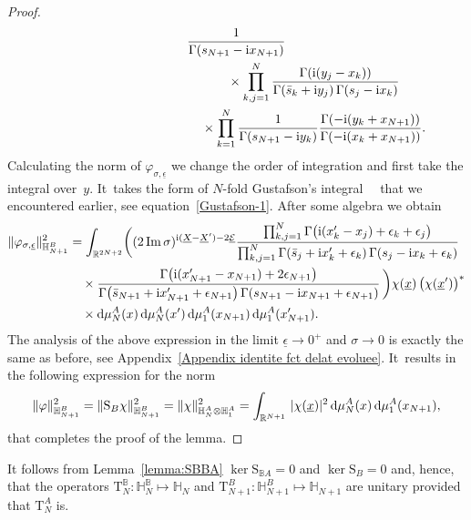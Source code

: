 \begin{proof}
\begin{gather*}
\frac1{\Gamma(s_{N+1}-{\rm i}x_{N+1})}
\\ \hphantom{\big(\Psi^N_{p,\underline y},\Phi^N_{{\sigma,x}}\otimes\Phi^1_{\sigma,x_{N+1}}\big)_{\mathbb H_N} =}
{}\times \prod_{k,j=1}^N\frac{\Gamma({\rm i}(y_j-x_k)
)}{\Gamma(\bar s_k+{\rm i}y_j)\,\Gamma(s_j-{\rm i}x_k)}
\\ \hphantom{\big(\Psi^N_{p,\underline y},\Phi^N_{{\sigma,x}}\otimes\Phi^1_{\sigma,x_{N+1}}\big)_{\mathbb H_N} =}
{}\times \prod_{k=1}^N\frac1{\Gamma(s_{N+1}-{\rm i}y_k)} \frac{ \Gamma(-{\rm i}(y_k+x_{N+1}) )}{\Gamma(-{\rm i}(x_k+x_{N+1}))}.
\end{gather*}
Calculating the norm of $\varphi_{\sigma,\underline \epsilon}$ we change the order of integration and first take the integral over~$y$. It~takes the form of $N$-fold Gustafson's integral~~\cite[Theorem 5.1]{MR1139492} that we encountered earlier, see equation~\eqref{Gustafson-1}.
After some algebra we obtain
\begin{align*}
\|\varphi_{\sigma,\underline \epsilon}\|^2_{\mathbb H_{N+1}^B} & = \int_{\mathbb R^{2N+2}}
\biggl((2\mathop{\rm Im}\sigma)^{{\rm i}(\underline X-\underline X')-2\underline{\mathcal E}}
\frac{\prod_{k,j=1}^{N} \Gamma\big({\rm i}(x'_k-x_j)+\epsilon_k+\epsilon_j\big)}{\prod_{k,j=1}^{N}
\Gamma( \bar s_j+{\rm i}x'_k+\epsilon_k)\,\Gamma( s_j-{\rm i}x_k+\epsilon_k)}
\\
&\quad
\times \frac{\Gamma\big({\rm i}(x'_{N+1}-x_{N+1})+2\epsilon_{N+1}\big)}{
\Gamma\big(\bar s_{N+1}+{\rm i}x'_{N+1}+\epsilon_{N+1}\big)\,\Gamma( s_{N+1}-{\rm i}x_{N+1}+\epsilon_{N+1})}\,\biggr)\chi(\underline x)\, \big(\chi(\underline x')\big)^*
\\
&\quad \times {\rm d}\mu_{N}^A(x)\,{\rm d}\mu_{N}^A(x')\, {\rm d}\mu_{1}^A(x_{N+1})\,{\rm d}\mu_{1}^A(x'_{N+1}).
\end{align*}
The analysis of the above expression in the limit $\underline \epsilon\to 0^+$ and $\sigma \to0$ is exactly the same as before, see
Appendix~\ref{Appendix identite fct delat evoluee}. It~results in the following expression for the norm
\begin{gather*}
\|\varphi\|^2_{\mathbb H_{N+1}^B} =\|\mathrm S_B\chi\|^2_{\mathbb H_{N+1}^B} =\|\chi\|^2_{\mathbb H_{N}^A\otimes \mathbb H_1^A}
=\int_{\mathbb R^{N+1}}\, |\chi(\underline x)|^2\,{\rm d}\mu_{N}^A(x)\, {\rm d}\mu_{1}^A(x_{N+1}),
\end{gather*}
that completes the proof of the lemma.
\end{proof}


It follows from Lemma~\ref{lemma:SBBA} $\ker \mathrm S_{\mathbb BA}=0$ and $\ker \mathrm S_B=0$ and, hence, that the operators $\mathrm
T_{N}^{\mathbb B}\colon \mathbb H_{N}^{\mathbb B}\mapsto \mathbb H_{N}$ and $\mathrm T_{N+1}^B\colon \mathbb H_{N+1}^B\mapsto \mathbb H_{N+1}$ are
unitary provided that $\mathrm T_{N}^A$ is.


